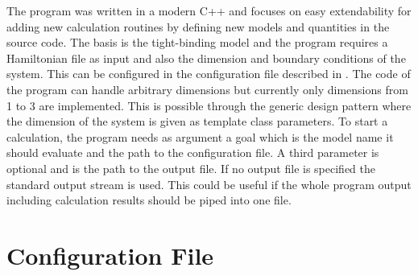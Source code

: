 \documentclass[a4paper,11pt]{report}
\begin{document}
The program was written in a modern C++ and focuses on easy extendability for adding new calculation routines by defining new models and quantities
in the source code. The basis is the
tight-binding model and the program requires a Hamiltonian file as input and also the dimension and boundary conditions of
the system. This can be configured in the configuration file described in . The code of the program can
handle arbitrary dimensions but currently only dimensions from 1 to 3 are implemented. This is possible through the generic
design pattern where the dimension of the system is given as template class parameters. To start a calculation, the program 
needs as argument a goal which is the model name it should evaluate and the path to the configuration file. A third parameter
is optional and is the path to the output file. If no output file is specified the standard output stream is used. This could
be useful if the whole program output including calculation results should be piped into one file. 

\section{Configuration File}\label{s:config-file}
\end{document}
